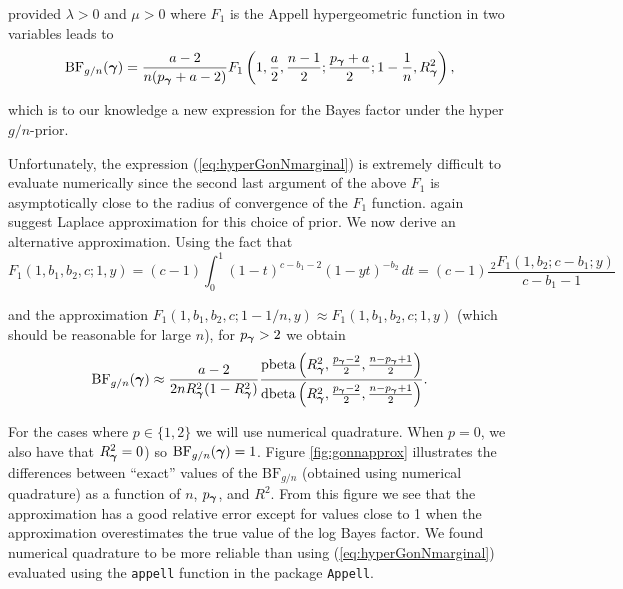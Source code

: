 \noindent provided $\lambda>0$ and $\mu>0$ where $F_1$ is the Appell hypergeometric function in two variables
\citep{Weisstein2009} leads to
\begin{equation}\label{eq:hyperGonNmarginal}
	\displaystyle \mbox{BF}_{g/n}({\boldsymbol \gamma}) =  \frac{a - 2}{n(p_{\boldsymbol \gamma} + a - 2)} F_1\left( 1, \frac{a}{2}, \frac{n-1}{2}; \frac{p_{\boldsymbol \gamma} + a}{2}; 1  -  \frac{1}{n}, R_{\boldsymbol \gamma}^2 \right),
\end{equation}

\noindent which is to our knowledge a new expression for the Bayes factor under the hyper $g/n$-prior.


Unfortunately, the expression (\ref{eq:hyperGonNmarginal}) is extremely
difficult to evaluate numerically since the second last argument of the above 
$F_1$ is asymptotically close to the radius of convergence of the $F_1$
function.
\cite{Liang2008} again suggest Laplace approximation 
for this choice of prior. We now derive an alternative approximation.
Using the fact that
$$
F_1(1,b_1,b_2,c; 1,y) 
= (c - 1)
\int_0^1  (1-t)^{c-b_1-2} (1-yt)^{-b_2} \, dt
= (c - 1) \frac{\, _2F_1(1,b_2;c-b_1;y)}{c-b_1-1}
$$

\noindent and the approximation $F_1(1,b_1,b_2,c; 1-1/n,y)  \approx F_1(1,b_1,b_2,c; 1,y)$
(which should be reasonable for large $n$),
for $p_{\boldsymbol \gamma} > 2$ we obtain
\begin{equation}\label{eq:hyperGonNmarginalApprox}
	\displaystyle \mbox{BF}_{g/n}({\boldsymbol \gamma}) 
	\approx    
	\frac{a - 2}{2n R_{\boldsymbol \gamma}^2(1 - R_{\boldsymbol \gamma}^2)}   \frac{
		\mbox{pbeta}\left( R_{\boldsymbol \gamma}^2, \frac{p_{\boldsymbol \gamma}-2}{2}, \frac{n-p_{\boldsymbol \gamma}+1}{2} \right)
	}{
		\mbox{dbeta}\left( R_{\boldsymbol \gamma}^2, \frac{p_{\boldsymbol \gamma}-2}{2}, \frac{n-p_{\boldsymbol \gamma}+1}{2} \right)
	}.
\end{equation}

\noindent For the cases where $p\in \{1,2\}$ we
will use numerical quadrature. When $p=0$, we also have that $R_{\boldsymbol \gamma}^2= 0$) so $\mbox{BF}_{g/n}({\boldsymbol \gamma}) = 1$.
Figure \ref{fig:gonnapprox} illustrates the differences between ``exact'' values of the $\mbox{BF}_{g/n}$
(obtained using numerical quadrature) as a function of $n$, $p_{\boldsymbol \gamma}$, and $R^2$. From this figure we
see that the approximation has a good relative error except for values close to 1 when the approximation
overestimates the true value of the log Bayes factor. We found numerical quadrature to be more reliable
than using (\ref{eq:hyperGonNmarginal}) evaluated using the {\tt appell} function in the package 
{\tt Appell}.


